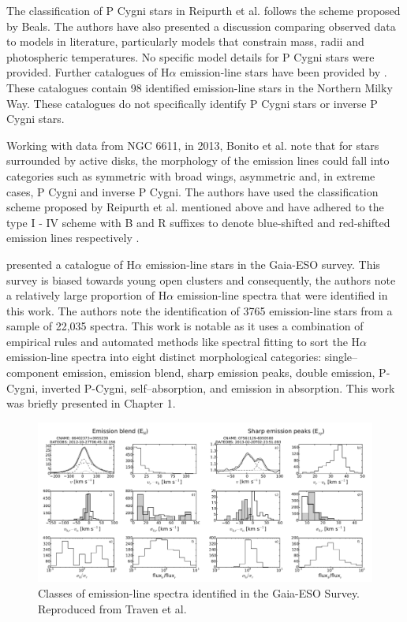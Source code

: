 The classification of P Cygni stars in Reipurth et al. follows the scheme proposed by Beals. The authors have also presented a discussion comparing observed data to models in literature, particularly models that constrain mass, radii and photospheric temperatures. No specific model details for P Cygni stars were provided. Further catalogues of H$\alpha$ emission-line stars have been provided by \citet{kohoutek1999catalogue}. These catalogues contain 98 identified emission-line stars in the Northern Milky Way. These catalogues do not specifically identify P Cygni stars or inverse P Cygni stars.

Working with data from NGC 6611, in 2013, Bonito et al. note that for stars surrounded by active disks, the morphology of the emission lines could fall into categories such as symmetric with broad wings, asymmetric and, in extreme cases, P Cygni and inverse P Cygni. The authors have used the classification scheme proposed by Reipurth et al. mentioned above and have adhered to the type I - IV scheme with B and R suffixes to denote blue-shifted and red-shifted emission lines respectively \citep{bonito2013spectroscopic}.

 \citet{traven2015gaia} presented a catalogue of H$\alpha$ emission-line stars in the Gaia-ESO survey. This survey is biased towards young open clusters and consequently, the authors note a relatively large proportion of H$\alpha$ emission-line spectra that were identified in this work. The authors note the identification of 3765 emission-line stars from a sample of 22,035 spectra. This work is notable as it uses a combination of empirical rules and automated methods like spectral fitting to sort the H$\alpha$ emission-line spectra into eight distinct morphological categories: single–component emission, emission blend, sharp emission peaks, double emission, P-Cygni, inverted P-Cygni, self–absorption, and emission in absorption. This work was briefly presented in Chapter 1. 

\begin{figure}[!htb]
\centering
\includegraphics[scale=.50]{figures/gaia eso1.png}
\caption{Classes of emission-line spectra identified in the Gaia-ESO Survey. Reproduced from Traven et al.}
\end{figure}

